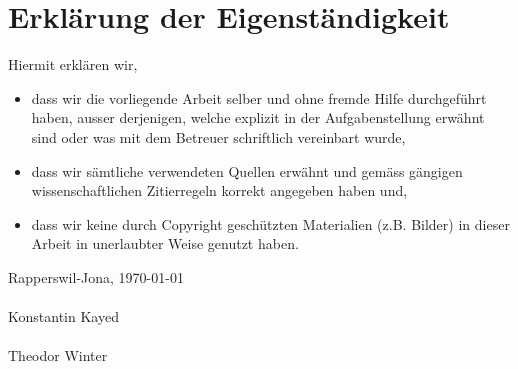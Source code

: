 \chapter*{Erklärung der Eigenständigkeit}

Hiermit erklären wir,

\begin{itemize}
\item dass wir die vorliegende Arbeit selber und ohne fremde Hilfe durchgeführt haben, ausser derjenigen, welche explizit in der Aufgabenstellung erwähnt sind oder was mit dem Betreuer schriftlich vereinbart wurde,

\item dass wir sämtliche verwendeten Quellen erwähnt und gemäss gängigen wissenschaftlichen Zitierregeln korrekt angegeben haben und,

\item dass wir keine durch Copyright geschützten Materialien (z.B. Bilder) in dieser Arbeit in unerlaubter Weise genutzt haben.
\end{itemize}


Rapperswil-Jona, \today
\\
\\
Konstantin Kayed
\\
\\
Theodor Winter